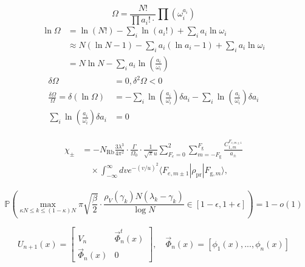 \documentclass[12pt, a4paper, oneside]{ctexart}
\begin{document}
\begin{equation}
    \Omega = \frac{N!}{\prod a_i! \cdot }\prod (\omega_i^{a_i}) \tag{5}
\end{equation}
\begin{equation}
    \begin{split}
        \ln\Omega & = \ln(N!) - \sum_i \ln(a_i!) + \sum_i a_i \ln\omega_i                   \\
                  & \approx N(\ln N - 1) - \sum_i a_i(\ln a_i - 1) + \sum_i a_i \ln\omega_i \\
                  & = N\ln N - \sum_i a_i \ln\left(\frac{a_i}{\omega_i}\right)
    \end{split}
\end{equation}
\begin{align}
    \delta\Omega                                              & = 0,\delta^2\Omega < 0 \tag{5}                                                                                                   \\
    \frac{\delta\Omega}{\Omega} = \delta(\ln \Omega)          & = -\sum_i \ln \left( \frac{a_i}{\omega_i} \right) \delta a_i - \sum_i \ln \left( \frac{a_i}{\omega_i} \right) \delta a_i \tag{6} \\
    \sum_i \ln \left( \frac{a_i}{\omega_i} \right) \delta a_i & = 0 \tag{7}
\end{align}

\begin{gather}
    \begin{aligned}
        \chi_{\pm} & = - N_{\mathrm{Rb}}\frac{3\lambda^3}{4\pi^2} \cdot \frac{\Gamma}{\Omega_0} \cdot \frac{1}{\sqrt{\pi}u} \sum_{F_e=0}^{2} \sum_{m=-F_{\mathrm{g}}}^{F_{\mathrm{g}}} \frac{C_{1,m}^{F_{e,m\pm1}}}{a_{\pm}} \\
                   & \quad \times \int_{-\infty}^{\infty} dv e^{-(v/u)^2} \langle F_{e,m \pm 1}|\rho_{\mathrm{p}\mathrm{r}}|F_{\mathrm{g},m} \rangle,
    \end{aligned}\tag{4}
\end{gather}


\begin{equation}
    \mathbb{P}\left(\max_{\kappa N \leq k \leq (1 - \kappa)N} \pi \sqrt{\frac{\beta}{2}} \cdot  \frac{\rho_V (\gamma_k) N(\lambda_k - \gamma_k)}{\log N} \in [1 - \epsilon, 1 + \epsilon]\right) = 1 - o(1)
\end{equation}

\begin{equation}
    U_{n+1}(x) = \begin{bmatrix} V_n & \vec{\Phi}_n^t(x) \\ \vec{\Phi}_n (x) & 0 \end{bmatrix}, \quad \vec{\Phi}_n (x)= [\phi_1 (x), . . . ,\phi_n (x)]
\end{equation}
\end{document}
